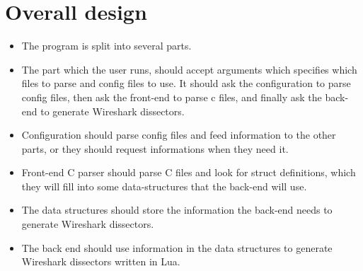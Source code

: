 \section{Overall design}
\begin{itemize}
	\item The program is split into several parts.
	\item The part which the user runs, should accept arguments which specifies which files to parse and config files to use. It should ask the configuration to parse config files, then ask the front-end to parse c files, and finally ask the back-end to generate Wireshark dissectors.
	\item Configuration should parse config files and feed information to the other parts, or they should request informations when they need it.
	\item Front-end C parser should parse C files and look for struct definitions, which they will fill into some data-structures that the back-end will use.
	\item The data structures should store the information the back-end needs to generate Wireshark dissectors.
	\item The back end should use information in the data structures to generate Wireshark dissectors written in Lua.
\end{itemize}

